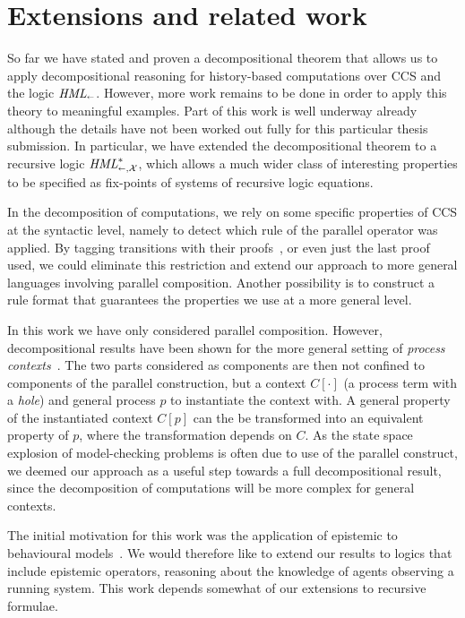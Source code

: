 \section{Extensions and related work} %
\label{sec:decomp_future}

So far we have stated and proven a decompositional theorem that allows us to
apply decompositional reasoning for history-based computations over CCS and
the logic $\textit{HML}_\shortleftarrow$. However, more work remains to be done in order to apply
this theory to meaningful examples. Part of this work is well underway already
although the details have not been worked out fully for this particular thesis
submission. In particular, we have extended the decompositional theorem to a
recursive logic $\textit{HML}_{\shortleftarrow,\mathcal{X}}^*$, which allows a much wider class of interesting 
properties to be specified as fix-points of systems of recursive logic equations.

In the decomposition of computations, we rely on some specific properties of 
CCS at the syntactic level, namely to detect which rule of the parallel operator
was applied. By tagging transitions with their proofs~\cite{BoudolC94,DeganoP92}, 
or even just the last
proof used, we could eliminate this restriction and extend our approach to more
general languages involving parallel composition. Another possibility is to construct
a rule format that guarantees the properties we use at a more general level.

In this work we have only considered parallel composition. However, decompositional
results have been shown for the more general setting of \emph{process contexts}~\cite{Larsen91}.
The two parts considered as components are then not confined to components
of the parallel construction, but a context $C[\cdot]$ (a process term with a \emph{hole})
and general process $p$ to instantiate the context with. A general property of the
instantiated context $C[p]$ can the be transformed into an equivalent property
of $p$, where the transformation depends on $C$. As the state space explosion
of model-checking problems is often due to use of the parallel construct, we
deemed our approach as a useful step towards a full decompositional result, since
the decomposition of computations will be more complex for general contexts.

The initial motivation for this work was the application of epistemic
to behavioural models~\cite{Mousavi07-LPAR}. We would therefore like to extend
our results to logics that include epistemic operators, reasoning about the knowledge
of agents observing a running system. This work depends somewhat of our extensions
to recursive formulae.

